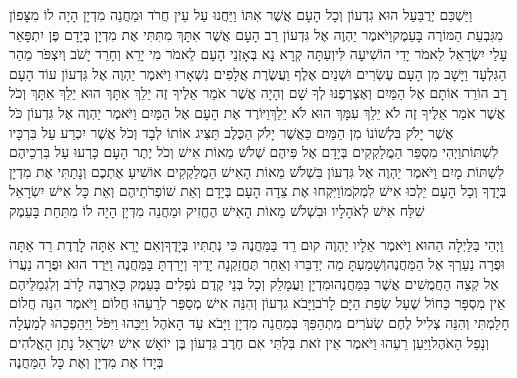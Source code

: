 \documentclass[../main/main.tex]{subfiles}
\begin{document}
\begin{multicols*}{\ncols}
וַיַּשְׁכֵּם יְרֻבַּעַל הוּא גִדְעוֹן וְכָל הָעָם אֲשֶׁר אִתּוֹ וַיַּחֲנוּ עַל עֵין חֲרֹד וּמַחֲנֵה מִדְיָן הָיָה לוֹ מִצָּפוֹן מִגִּבְעַת הַמּוֹרֶה בָּעֵמֶק\PreVerseSpace{}וַיֹּאמֶר יַהְוֶה אֶל גִּדְעוֹן רַב הָעָם אֲשֶׁר אִתָּךְ מִתִּתִּי אֶת מִדְיָן בְּיָדָם פֶּן יִתְפָּאֵר עָלַי יִשְׂרָאֵל לֵאמֹר יָדִי הוֹשִׁיעָה לִּי\PreVerseSpace{}וְעַתָּה קְרָא נָא בְּאָזְנֵי הָעָם לֵאמֹר מִי יָרֵא וְחָרֵד יָשֹׁב וְיִצְפֹּר מֵהַר הַגִּלְעָד וַיָּשָׁב מִן הָעָם עֶשְׂרִים וּשְׁנַיִם אֶלֶף וַעֲשֶׂרֶת אֲלָפִים נִשְׁאָרוּ \ClosedSection{}וַיֹּאמֶר יַהְוֶה אֶל גִּדְעוֹן עוֹד הָעָם רָב הוֹרֵד אוֹתָם אֶל הַמַּיִם וְאֶצְרְפֶנּוּ לְךָ שָׁם וְהָיָה אֲשֶׁר אֹמַר אֵלֶיךָ זֶה יֵלֵךְ אִתָּךְ הוּא יֵלֵךְ אִתָּךְ וְכֹל אֲשֶׁר אֹמַר אֵלֶיךָ זֶה לֹא יֵלֵךְ עִמָּךְ הוּא לֹא יֵלֵךְ\PreVerseSpace{}וַיּוֹרֶד אֶת הָעָם אֶל הַמָּיִם \ClosedSection{}וַיֹּאמֶר יַהְוֶה אֶל גִּדְעוֹן כֹּל אֲשֶׁר יָלֹק בִּלְשׁוֹנוֹ מִן הַמַּיִם כַּאֲשֶׁר יָלֹק הַכֶּלֶב תַּצִּיג אוֹתוֹ לְבָד וְכֹל אֲשֶׁר יִכְרַע עַל בִּרְכָּיו לִשְׁתּוֹת\PreVerseSpace{}וַיְהִי מִסְפַּר הַמֲלַקְקִים בְּיָדָם אֶל פִּיהֶם שְׁלֹשׁ מֵאוֹת אִישׁ וְכֹל יֶתֶר הָעָם כָּרְעוּ עַל בִּרְכֵיהֶם לִשְׁתּוֹת מָיִם \ClosedSection{}וַיֹּאמֶר יַהְוֶה אֶל גִּדְעוֹן בִּשְׁלֹשׁ מֵאוֹת הָאִישׁ הַמֲלַקְקִים אוֹשִׁיעַ אֶתְכֶם וְנָתַתִּי אֶת מִדְיָן בְּיָדֶךָ וְכָל הָעָם יֵלְכוּ אִישׁ לִמְקֹמוֹ\PreVerseSpace{}וַיִּקְחוּ אֶת צֵדָה הָעָם בְּיָדָם וְאֵת שׁוֹפְרֹתֵיהֶם וְאֵת כָּל אִישׁ יִשְׂרָאֵל שִׁלַּח אִישׁ לְאֹהָלָיו וּבִשְׁלֹשׁ מֵאוֹת הָאִישׁ הֶחֱזִיק וּמַחֲנֵה מִדְיָן הָיָה לוֹ מִתַּחַת בָּעֵמֶק\OpenSection{}\par
{}וַיְהִי בַּלַּיְלָה הַהוּא וַיֹּאמֶר אֵלָיו יַהְוֶה קוּם רֵד בַּמַּחֲנֶה כִּי נְתַתִּיו בְּיָדֶךָ\PreVerseSpace{}וְאִם יָרֵא אַתָּה לָרֶדֶת רֵד אַתָּה וּפֻרָה נַעַרְךָ אֶל הַמַּחֲנֶה\PreVerseSpace{}וְשָׁמַעְתָּ מַה יְדַבֵּרוּ וְאַחַר תֶּחֱזַקְנָה יָדֶיךָ וְיָרַדְתָּ בַּמַּחֲנֶה וַיֵּרֶד הוּא וּפֻרָה נַעֲרוֹ אֶל קְצֵה הַחֲמֻשִׁים אֲשֶׁר בַּמַּחֲנֶה\PreVerseSpace{}וּמִדְיָן וַעֲמָלֵק וְכָל בְּנֵי קֶדֶם נֹפְלִים בָּעֵמֶק כָּאַרְבֶּה לָרֹב וְלִגְמַלֵּיהֶם אֵין מִסְפָּר כַּחוֹל שֶׁעַל שְׂפַת הַיָּם לָרֹב\PreVerseSpace{}וַיָּבֹא גִדְעוֹן וְהִנֵּה אִישׁ מְסַפֵּר לְרֵעֵהוּ חֲלוֹם וַיֹּאמֶר הִנֵּה חֲלוֹם חָלַמְתִּי וְהִנֵּה צְלִיל\SubEnd{} לֶחֶם שְׂעֹרִים מִתְהַפֵּךְ בְּמַחֲנֵה מִדְיָן וַיָּבֹא עַד הָאֹהֶל וַיַּכֵּהוּ וַיִּפֹּל וַיַּהַפְכֵהוּ לְמַעְלָה וְנָפַל הָאֹהֶל\PreVerseSpace{}וַיַּעַן רֵעֵהוּ וַיֹּאמֶר אֵין זֹאת בִּלְתִּי אִם חֶרֶב גִּדְעוֹן בֶּן יוֹאָשׁ אִישׁ יִשְׂרָאֵל נָתַן הָאֱלֹהִים בְּיָדוֹ אֶת מִדְיָן וְאֶת כָּל הַמַּחֲנֶה\OpenSection{}\par

\end{multicols*}
\end{document}
